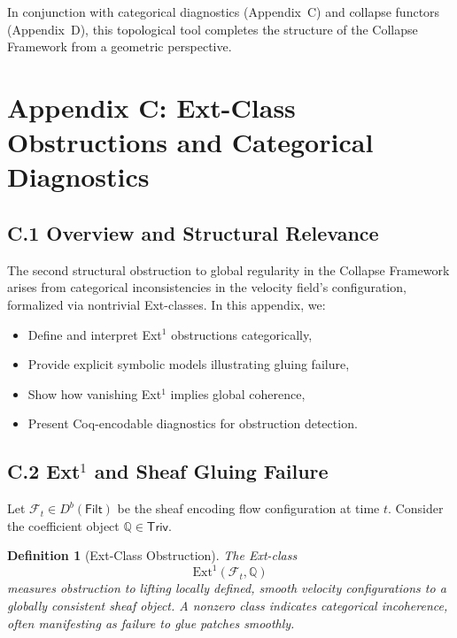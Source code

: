 \documentclass[11pt]{article}
\newtheorem{definition}[theorem]{Definition}
\begin{document}
In conjunction with categorical diagnostics (Appendix~C) and collapse functors (Appendix~D), this topological tool completes the structure of the Collapse Framework from a geometric perspective.




\appendix
\section*{Appendix C: \texorpdfstring{Ext-Class Obstructions and Categorical Diagnostics}{Ext-Class Obstructions and Categorical Diagnostics}}

\subsection{C.1 Overview and Structural Relevance}

The second structural obstruction to global regularity in the Collapse Framework arises from categorical inconsistencies in the velocity field's configuration, formalized via nontrivial Ext-classes. In this appendix, we:

\begin{itemize}
  \item Define and interpret Ext$^1$ obstructions categorically,
  \item Provide explicit symbolic models illustrating gluing failure,
  \item Show how vanishing Ext$^1$ implies global coherence,
  \item Present Coq-encodable diagnostics for obstruction detection.
\end{itemize}

\subsection{C.2 Ext$^1$ and Sheaf Gluing Failure}

Let \( \mathcal{F}_t \in D^b(\mathsf{Filt}) \) be the sheaf encoding flow configuration at time \( t \). Consider the coefficient object \( \mathbb{Q} \in \mathsf{Triv} \).

\begin{definition}[Ext-Class Obstruction]
The Ext-class
\[
\mathrm{Ext}^1(\mathcal{F}_t, \mathbb{Q})
\]
measures obstruction to lifting locally defined, smooth velocity configurations to a globally consistent sheaf object. A nonzero class indicates categorical incoherence, often manifesting as failure to glue patches smoothly.
\end{definition}
\end{document}

